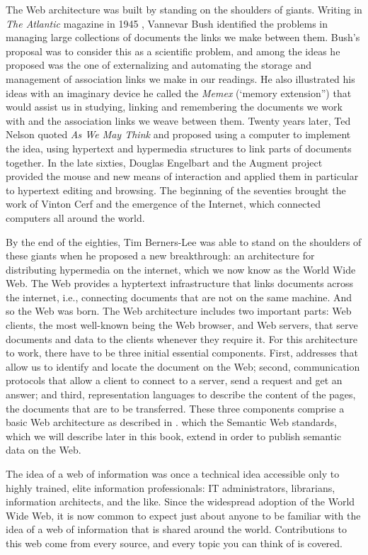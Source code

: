 The Web architecture was built by standing on the shoulders of giants. Writing in \emph{The Atlantic} magazine in 1945
\cite{Bush45aswe},
Vannevar Bush identified the problems in managing large collections of documents the links 
we make between them. Bush’s proposal was to consider this as a scientific problem, and among the ideas he proposed was the one of 
externalizing and automating 
the storage and management of association links we make in our readings. He also illustrated his ideas with an imaginary device he called 
the \textit{Memex} (‘memory extension”) that would assist us in studying, linking and remembering the documents we work with and the association 
links we weave between them. Twenty years later, Ted Nelson quoted \textit{As We May Think} and proposed using a computer to implement the idea, 
using hypertext and hypermedia structures to link parts of documents together. In the late sixties, Douglas Engelbart and the Augment project 
provided the mouse and new means of interaction and applied them in particular to hypertext editing and browsing. The beginning of the 
seventies brought the work of Vinton Cerf and the emergence of the Internet, which connected computers all around the world. 

By the 
end of the eighties, Tim Berners-Lee was able to stand on the shoulders of these giants when he proposed a new breakthrough: an architecture 
for distributing hypermedia on the internet, which we now know as the World Wide Web. The Web provides a hyptertext infrastructure that links 
documents across the internet, i.e., connecting documents that are not on the same machine. And so the Web was born. The Web architecture 
includes two important parts: Web clients, the most well-known being the Web browser, and  Web servers, that serve documents and data 
to the clients whenever they require it. For this architecture to work, there have to be three initial essential components. 
First, addresses that allow us to identify and locate the document on the Web; second, communication protocols that allow 
a client to connect to a server, send a request and get an answer; and third, representation languages to describe the 
content of the pages, the documents that are to be transferred. These three components comprise a basic Web architecture as described in  \cite{Jacobs:04:AWW}.
which the Semantic Web standards, which we will describe later in this book, extend in order to publish semantic data on the Web.

The idea of a web of information was once a technical idea accessible only to highly trained, elite information professionals: 
IT administrators, librarians, information architects, and the like. Since the widespread adoption of the World Wide Web, 
it is now common to expect just about anyone to be familiar with the idea of a 
web of information that is shared around the world. Contributions to 
this web come from every source, and every topic you can think of is covered.

